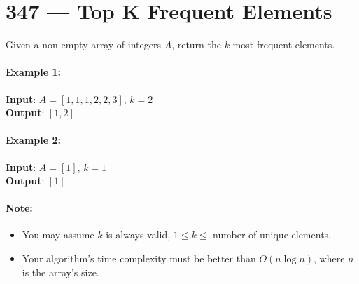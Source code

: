 \section{347 --- Top K Frequent Elements}
Given a non-empty array of integers $ A $, return the $ k $ most frequent elements.

\paragraph{Example 1:}

\begin{flushleft}
\textbf{Input}: $ A = [1,1,1,2,2,3] $, $ k = 2 $
\\
\textbf{Output}: $  [1,2] $
\end{flushleft}

\paragraph{Example 2:}

\begin{flushleft}
\textbf{Input}: $ A = [1] $, $ k = 1 $
\\
\textbf{Output}: $ [1] $
\end{flushleft}

\paragraph{Note:}

\begin{itemize}
\item You may assume $ k $ is always valid, $ 1 \leq k \leq $ number of unique elements.
\item Your algorithm's time complexity must be better than $O(n \log n)$, where $ n $ is the array's size.
\end{itemize}

